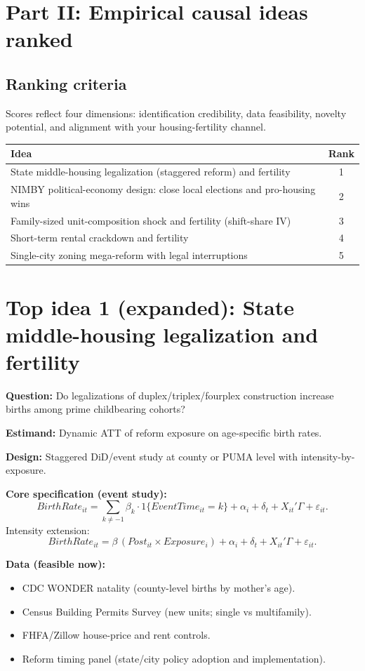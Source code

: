 \documentclass[11pt]{article}
\begin{document}
\section{Part II: Empirical causal ideas ranked}

\subsection*{Ranking criteria}
Scores reflect four dimensions: identification credibility, data feasibility, novelty potential, and alignment with your housing-fertility channel.

\begin{center}
\begin{tabular}{p{}c}
\toprule
Idea & Rank \\
\midrule
State middle-housing legalization (staggered reform) and fertility & 1 \\
NIMBY political-economy design: close local elections and pro-housing wins & 2 \\
Family-sized unit-composition shock and fertility (shift-share IV) & 3 \\
Short-term rental crackdown and fertility & 4 \\
Single-city zoning mega-reform with legal interruptions & 5 \\
\bottomrule
\end{tabular}
\end{center}

\section{Top idea 1 (expanded): State middle-housing legalization and fertility}
\textbf{Question:} Do legalizations of duplex/triplex/fourplex construction increase births among prime childbearing cohorts?

\textbf{Estimand:} Dynamic ATT of reform exposure on age-specific birth rates.

\textbf{Design:} Staggered DiD/event study at county or PUMA level with intensity-by-exposure.

\textbf{Core specification (event study):}
\[
BirthRate_{it} = \sum_{k \neq -1}\beta_k \cdot 1\{EventTime_{it}=k\} + \alpha_i + \delta_t + X_{it}'\Gamma + \varepsilon_{it}.
\]
Intensity extension:
\[
BirthRate_{it} = \beta\,(Post_{it}\times Exposure_i) + \alpha_i + \delta_t + X_{it}'\Gamma + \varepsilon_{it}.
\]

\textbf{Data (feasible now):}
\begin{itemize}
\item CDC WONDER natality (county-level births by mother's age).
\item Census Building Permits Survey (new units; single vs multifamily).
\item FHFA/Zillow house-price and rent controls.
\item Reform timing panel (state/city policy adoption and implementation).
\end{itemize}
\end{document}
